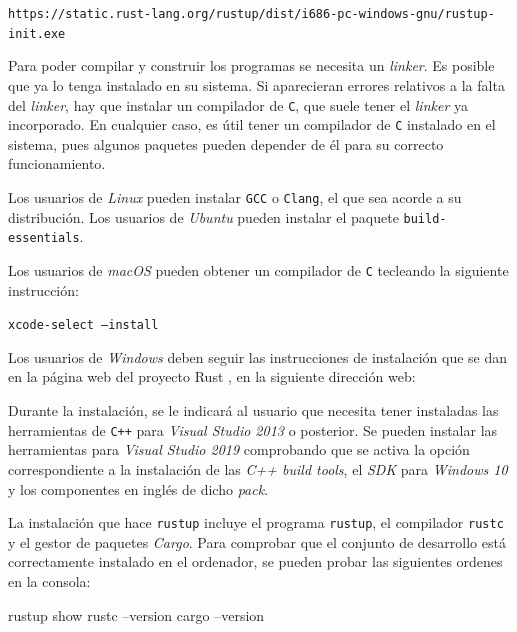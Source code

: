 {\centering \footnotesize \texttt{https://static.rust-lang.org/rustup/dist/i686-pc-windows-gnu/rustup-init.exe} \par}

Para poder compilar y construir los programas se necesita un \textit{linker}. Es posible que ya lo tenga instalado en su sistema. Si aparecieran errores relativos a la falta del \textit{linker}, hay que instalar un compilador de \texttt{C}, que suele tener el \textit{linker} ya incorporado. En cualquier caso, es útil tener un compilador de \texttt{C} instalado en el sistema, pues algunos paquetes pueden depender de él para su correcto funcionamiento.

Los usuarios de \textit{Linux} pueden instalar \texttt{GCC} o \texttt{Clang}, el que sea acorde a su distribución. Los usuarios de \textit{Ubuntu} pueden instalar el paquete \texttt{build-essentials}.

Los usuarios de \textit{macOS} pueden obtener un compilador de \texttt{C}
tecleando la siguiente instrucción:

{\centering \texttt{xcode-select --install}\par}

Los usuarios de \textit{Windows} deben seguir las instrucciones de instalación que se dan en la página web del proyecto Rust \citep{klabnikRustProgrammingLanguage}, en la siguiente dirección web:

{\centering{}\selectfont{https://www.rust-lang.org/tools/install}\par}

Durante la instalación, se le indicará al usuario que necesita tener instaladas las herramientas de \texttt{C++} para \textit{Visual Studio 2013} o posterior. Se pueden instalar las herramientas para \textit{Visual Studio 2019} comprobando que se activa la opción correspondiente a la instalación de las \textit{C++ build tools}, el \textit{SDK} para \textit{Windows 10} y los componentes en inglés de dicho \textit{pack}.

La instalación que hace \texttt{rustup} incluye el programa \texttt{rustup}, el compilador \texttt{rustc} y el gestor de paquetes \textit{Cargo}. Para comprobar que el conjunto de desarrollo está correctamente instalado en el ordenador, se pueden probar las siguientes ordenes en la consola:

\begin{Codigo}
rustup show
rustc --version
cargo --version
\end{Codigo}


